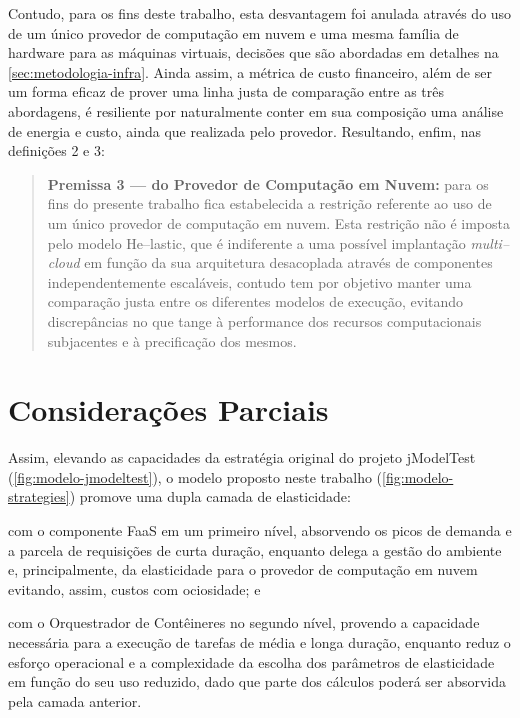 \documentclass[english,brazilian]{UNISINOSmonografia} %
\begin{document}
Contudo, para os fins deste trabalho, esta desvantagem foi anulada através do uso de um único provedor de computação em nuvem e uma mesma família de hardware para as máquinas virtuais, decisões que são abordadas em detalhes na \autoref{sec:metodologia-infra}.
Ainda assim, a métrica de custo financeiro, além de ser um forma eficaz de prover uma linha justa de comparação entre as três abordagens, é resiliente por naturalmente conter em sua composição uma análise de energia e custo, ainda que realizada pelo provedor.
Resultando, enfim, nas definições 2 e 3:
\begin{quote}
	\textbf{Premissa 3 --- do Provedor de Computação em Nuvem:} para os fins do presente trabalho fica estabelecida a restrição referente ao uso de um único provedor de computação em nuvem. Esta restrição não é imposta pelo modelo \textsf{He}--lastic, que é indiferente a uma possível implantação \textit{multi--cloud} em função da sua arquitetura desacoplada através de componentes independentemente escaláveis, contudo tem por objetivo manter uma comparação justa entre os diferentes modelos de execução, evitando discrepâncias no que tange à performance dos recursos computacionais subjacentes e à precificação dos mesmos.
\end{quote}


\section{Considerações Parciais}


Assim, elevando as capacidades da estratégia original do projeto jModelTest (\autoref{fig:modelo-jmodeltest}), o modelo proposto neste trabalho (\autoref{fig:modelo-strategies}) promove uma dupla camada de elasticidade:
\begin{inparaenum}[(i)]
	\item com o componente FaaS em um primeiro nível, absorvendo os picos de demanda e a parcela de requisições de curta duração, enquanto delega a gestão do ambiente e, principalmente, da elasticidade para o provedor de computação em nuvem evitando, assim, custos com ociosidade; e
	
	\item com o Orquestrador de Contêineres no segundo nível, provendo a capacidade necessária para a execução de tarefas de média e longa duração, enquanto reduz o esforço operacional e a complexidade da escolha dos parâmetros de elasticidade em função do seu uso reduzido, dado que parte dos cálculos poderá ser absorvida pela camada anterior.
\end{inparaenum}
\end{document}

